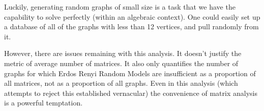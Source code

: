 \documentclass[a4paper,12pt]{article}
\begin{document}
Luckily, generating random graphs of small size is a task that we have the capability to solve perfectly (within an algebraic context).
One could easily set up a database of all of the graphs with less than 12 vertices, and pull randomly from it.

However, there are issues remaining with this analysis. 
It doesn't justify the metric of average number of matrices.
It also only quantifies the number of graphs for which Erdos Renyi Random Models are insufficient as a proportion of all matrices, not as a proportion of all graphs.
Even in this analysis (which attempts to reject this established vernacular) the convenience of matrix analysis is a powerful temptation.
\end{document}

